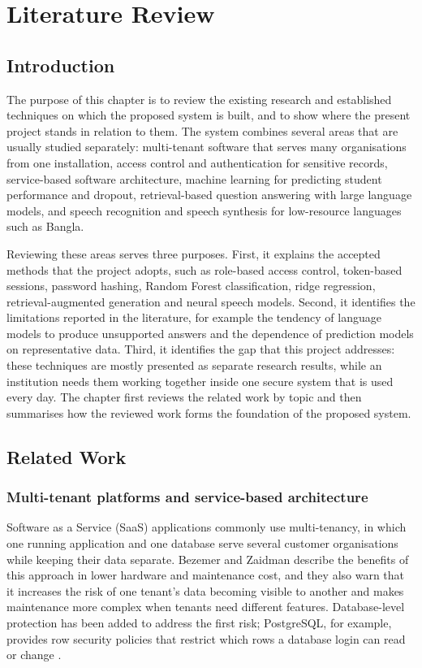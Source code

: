 \chapter{Literature Review}

\section{Introduction}
The purpose of this chapter is to review the existing research and established techniques on which the proposed system is built, and to show where the present project stands in relation to them. The system combines several areas that are usually studied separately: multi-tenant software that serves many organisations from one installation, access control and authentication for sensitive records, service-based software architecture, machine learning for predicting student performance and dropout, retrieval-based question answering with large language models, and speech recognition and speech synthesis for low-resource languages such as Bangla.

Reviewing these areas serves three purposes. First, it explains the accepted methods that the project adopts, such as role-based access control, token-based sessions, password hashing, Random Forest classification, ridge regression, retrieval-augmented generation and neural speech models. Second, it identifies the limitations reported in the literature, for example the tendency of language models to produce unsupported answers and the dependence of prediction models on representative data. Third, it identifies the gap that this project addresses: these techniques are mostly presented as separate research results, while an institution needs them working together inside one secure system that is used every day. The chapter first reviews the related work by topic and then summarises how the reviewed work forms the foundation of the proposed system.

\section{Related Work}

\subsection{Multi-tenant platforms and service-based architecture}
Software as a Service (SaaS) applications commonly use multi-tenancy, in which one running application and one database serve several customer organisations while keeping their data separate. Bezemer and Zaidman \cite{bezemer2010multitenant} describe the benefits of this approach in lower hardware and maintenance cost, and they also warn that it increases the risk of one tenant's data becoming visible to another and makes maintenance more complex when tenants need different features. Database-level protection has been added to address the first risk; PostgreSQL, for example, provides row security policies that restrict which rows a database login can read or change \cite{postgres_rls}.

